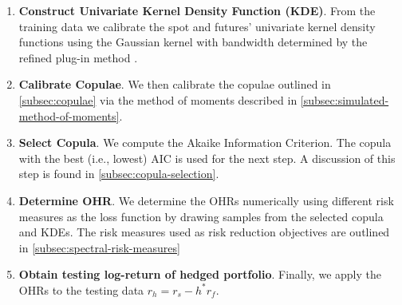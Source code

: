 \begin{enumerate}
\item \textbf{Construct Univariate Kernel Density Function (KDE)}.
  From the training data we calibrate the spot and futures'
  univariate kernel density functions using the Gaussian kernel with
  bandwidth determined by the refined plug-in method \citep[section
  3.3.3]{hardle2004nonparametric}.
\item \textbf{Calibrate Copulae}.
  We then calibrate the copulae outlined in \ref{subsec:copulae} via the
  method of moments described in \ref{subsec:simulated-method-of-moments}. 
\item \textbf{Select Copula}.
  We compute the Akaike Information Criterion. The copula with the
  best (i.e., lowest) AIC is used for the next step. 
  A discussion of this step is found in \ref{subsec:copula-selection}.
\item \textbf{Determine OHR}.
  We determine the OHRs numerically using different risk measures as
  the loss function by drawing samples from the selected copula and
  KDEs. The risk measures used as risk reduction objectives are
  outlined in \ref{subsec:spectral-risk-measures} 
  \item \textbf{Obtain testing log-return of hedged portfolio}.
  Finally, we apply the OHRs to the testing data $r_h = r_s - h^* r_f$.
  \end{enumerate}












%

